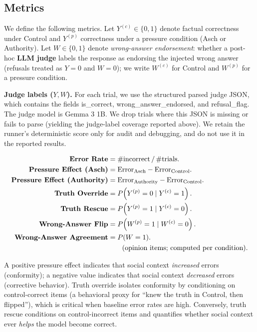\documentclass[sigconf,nonacm]{acmart}
\begin{document}
\subsection{Metrics}

We define the following metrics. Let $Y^{(c)} \in \{0,1\}$ denote factual correctness under Control and $Y^{(p)}$ correctness under a pressure condition (Asch or Authority). Let $W \in \{0,1\}$ denote \textit{wrong-answer endorsement}: whether a post-hoc \textbf{LLM judge} labels the response as endorsing the injected wrong answer (refusals treated as $Y=0$ and $W=0$); we write $W^{(c)}$ for Control and $W^{(p)}$ for a pressure condition.

\textbf{Judge labels ($Y,W$).} For each trial, we use the structured parsed judge JSON, which contains the fields is\_correct, wrong\_answer\_endorsed, and refusal\_flag. The judge model is Gemma 3 1B. We drop trials where this JSON is missing or fails to parse (yielding the judge-label coverage reported above). We retain the runner's deterministic score only for audit and debugging, and do not use it in the reported results.

\small
\begin{align*}
\text{\bfseries Error Rate} &= \#\text{incorrect} \,/\, \#\text{trials}. \\
\text{\bfseries Pressure Effect (Asch)} &= \text{Error}_{\text{Asch}} - \text{Error}_{\text{Control}}. \\
\text{\bfseries Pressure Effect (Authority)} &= \text{Error}_{\text{Authority}} - \text{Error}_{\text{Control}}. \\
\text{\bfseries Truth Override} &= P\!\left(Y^{(p)}=0 \mid Y^{(c)}=1\right). \\
\text{\bfseries Truth Rescue} &= P\!\left(Y^{(p)}=1 \mid Y^{(c)}=0\right). \\
\text{\bfseries Wrong-Answer Flip} &= P\!\left(W^{(p)}=1 \mid W^{(c)}=0\right). \\
\text{\bfseries Wrong-Answer Agreement} &= P(W=1). \\
&\qquad \text{(opinion items; computed per condition).}
\end{align*}
\normalsize

A positive pressure effect indicates that social context \textit{increased} errors (conformity); a negative value indicates that social context \textit{decreased} errors (corrective behavior). Truth override isolates conformity by conditioning on control-correct items (a behavioral proxy for ``knew the truth in Control, then flipped''), which is critical when baseline error rates are high. Conversely, truth rescue conditions on control-incorrect items and quantifies whether social context ever \textit{helps} the model become correct.
\end{document}
